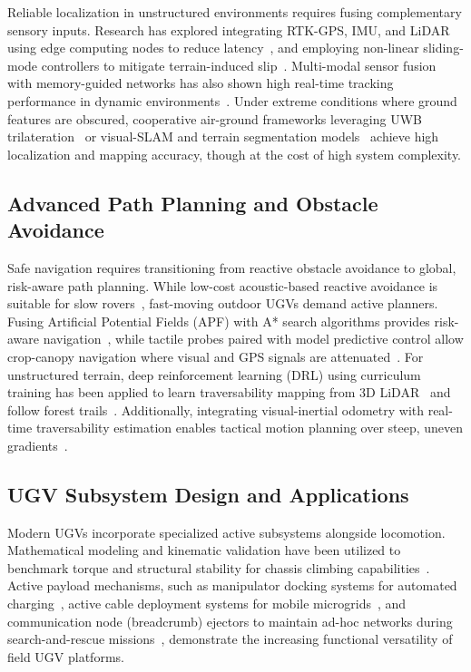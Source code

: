 \documentclass[conference]{IEEEtran}
\begin{document}
Reliable localization in unstructured environments requires fusing complementary sensory inputs. Research has explored integrating RTK-GPS, IMU, and LiDAR using edge computing nodes to reduce latency~\cite{seelam2025iot}, and employing non-linear sliding-mode controllers to mitigate terrain-induced slip~\cite{gonzalez2025robust}. Multi-modal sensor fusion with memory-guided networks has also shown high real-time tracking performance in dynamic environments~\cite{han2025real}. Under extreme conditions where ground features are obscured, cooperative air-ground frameworks leveraging UWB trilateration~\cite{yue2025uav} or visual-SLAM and terrain segmentation models~\cite{gupta2025drone} achieve high localization and mapping accuracy, though at the cost of high system complexity.

\subsection{Advanced Path Planning and Obstacle Avoidance}

Safe navigation requires transitioning from reactive obstacle avoidance to global, risk-aware path planning. While low-cost acoustic-based reactive avoidance is suitable for slow rovers~\cite{desimone2018obstacle}, fast-moving outdoor UGVs demand active planners. Fusing Artificial Potential Fields (APF) with A* search algorithms provides risk-aware navigation~\cite{jiang2024risk}, while tactile probes paired with model predictive control allow crop-canopy navigation where visual and GPS signals are attenuated~\cite{gronewold2025tactile}. For unstructured terrain, deep reinforcement learning (DRL) using curriculum training has been applied to learn traversability mapping from 3D LiDAR~\cite{sanchez2023reinforcement} and follow forest trails~\cite{tibermacine2026autonomous}. Additionally, integrating visual-inertial odometry with real-time traversability estimation enables tactical motion planning over steep, uneven gradients~\cite{mukherjee2025terrain}.

\subsection{UGV Subsystem Design and Applications}

Modern UGVs incorporate specialized active subsystems alongside locomotion. Mathematical modeling and kinematic validation have been utilized to benchmark torque and structural stability for chassis climbing capabilities~\cite{dolya2025development}. Active payload mechanisms, such as manipulator docking systems for automated charging~\cite{jung2026autonomous}, active cable deployment systems for mobile microgrids~\cite{naglak2021cable}, and communication node (breadcrumb) ejectors to maintain ad-hoc networks during search-and-rescue missions~\cite{fisher2025developing}, demonstrate the increasing functional versatility of field UGV platforms.
\end{document}
